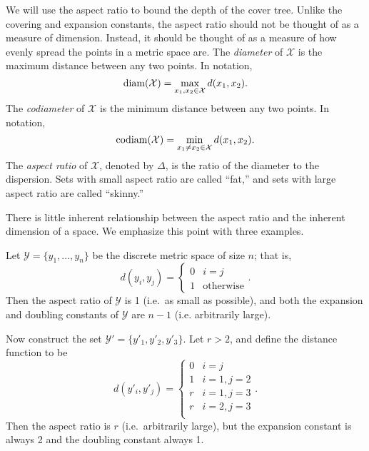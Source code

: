 \documentclass[../main.tex]{subfiles}
\newcommand{\set}[1]{\mathcal {#1}}
\newcommand{\dist}[2]{\distf({#1},{#2})}
\newcommand{\distf}{d}
\newcommand{\diam}[1]{\textnormal{diam}({#1})}
\newcommand{\codiam}[1]{\textnormal{codiam}({#1})}
\newcommand{\aspect}[1]{\Delta}
\begin{document}
We will use the aspect ratio to bound the depth of the cover tree.
Unlike the covering and expansion constants,
the aspect ratio should not be thought of as a measure of dimension.
Instead, it should be thought of as a measure of how evenly spread the points in a metric space are.
The \emph{diameter} of $\set X$ is the maximum distance between any two points.
In notation,
\begin{equation}
    \diam {\set X} = \max_{x_1,x_2\in\set X} \dist{x_1}{x_2}
    .
\end{equation}
The \emph{codiameter} of $\set X$ is the minimum distance between any two points.
In notation,
\begin{equation}
    \codiam {\set X} = \min_{x_1 \ne x_2\in\set X} \dist{x_1}{x_2}
    .
\end{equation}
The \emph{aspect ratio} of $\set X$, denoted by $\aspect{\set X}$, 
is the ratio of the diameter to the dispersion.
Sets with small aspect ratio are called ``fat,''
and sets with large aspect ratio are called ``skinny.''

There is little inherent relationship between the aspect ratio and the inherent dimension of a space.
We emphasize this point with three examples.

\begin{example}
    Let $\set Y=\{y_1,...,y_n\}$ be the discrete metric space of size $n$;
    that is,
    \begin{equation}
        \dist{y_i}{y_j}=
        \begin{cases}
            0 & i = j \\
            1 & \text{otherwise}
        \end{cases}
        .
    \end{equation}
    Then the aspect ratio of $\set Y$ is 1 (i.e.\ as small as possible),
    and both the expansion and doubling constants of $\set Y$ are $n-1$ (i.e. arbitrarily large).
\end{example}

\begin{example}
    Now construct the set $\set Y'=\{y'_1, y'_2, y'_3\}$.
    Let $r>2$, and define the distance function to be
    \begin{equation}
        d(y'_i,y'_j) =
        \begin{cases}
            0 & i=j \\
            1 & i=1, j=2 \\
            r & i=1, j=3 \\
            r & i=2, j=3 \\
        \end{cases}
        .
    \end{equation}
    Then the aspect ratio is $r$ (i.e.\ arbitrarily large),
    but the expansion constant is always 2
    and the doubling constant always 1.
\end{example}
\end{document}
